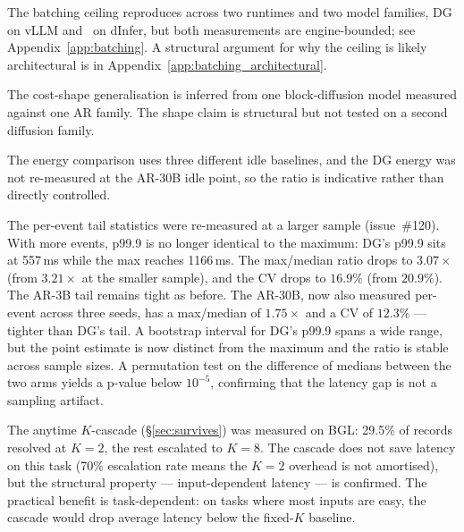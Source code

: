 The batching ceiling reproduces across two runtimes and two model
families, DG on vLLM and \LLaDA\ on dInfer, but both measurements
are engine-bounded; see
Appendix~\ref{app:batching}. A structural argument for why the ceiling
is likely architectural is in Appendix~\ref{app:batching_architectural}.

The cost-shape generalisation is inferred from one block-diffusion
model measured against one AR family. The shape claim is structural but
not tested on a second diffusion family.

The energy comparison uses three different idle baselines, and the DG
energy was not re-measured at the AR-30B idle point, so the ratio is
indicative rather than directly controlled.

The per-event tail statistics were re-measured at a larger sample
(issue~\#120). With more events, p99.9 is no longer identical to the
maximum: DG's p99.9 sits at 557\,ms while the max reaches 1166\,ms.
The max/median ratio drops to $3.07\times$ (from $3.21\times$ at the
smaller sample), and the CV drops to $16.9\%$ (from $20.9\%$). The
AR-3B tail remains tight as before. The AR-30B, now also measured
per-event across three seeds, has a max/median of $1.75\times$ and
a CV of $12.3\%$ --- tighter than DG's tail. A bootstrap interval
for DG's p99.9 spans a wide range, but the point estimate is now
distinct from the maximum and the ratio is stable across sample
sizes. A permutation test on the difference of medians between the
two arms yields a p-value below $10^{-5}$, confirming that the
latency gap is not a sampling artifact.

The anytime $K$-cascade (\S\ref{sec:survives}) was measured on BGL:
29.5\% of records resolved at $K{=}2$, the rest escalated to $K{=}8$.
The cascade does not save latency on this task (70\% escalation rate
means the $K{=}2$ overhead is not amortised), but the structural
property --- input-dependent latency --- is confirmed. The practical
benefit is task-dependent: on tasks where most inputs are easy, the
cascade would drop average latency below the fixed-$K$ baseline.

